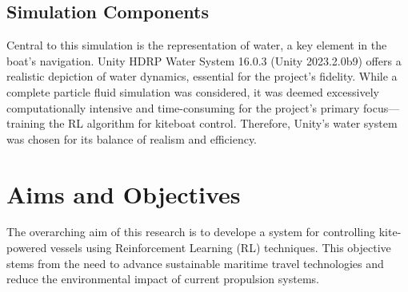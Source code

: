 \subsection{Simulation Components}
Central to this simulation is the representation of water, a key element in the boat's navigation. Unity HDRP Water System 16.0.3 (Unity 2023.2.0b9) offers a realistic depiction of water dynamics, essential for the project's fidelity. While a complete particle fluid simulation was considered, it was deemed excessively computationally intensive and time-consuming for the project's primary focus—training the RL algorithm for kiteboat control. Therefore, Unity's water system was chosen for its balance of realism and efficiency.







\section{Aims and Objectives}

The overarching aim of this research is to develope a system for controlling kite-powered vessels using Reinforcement Learning (RL) techniques. This objective stems from the need to advance sustainable maritime travel technologies and reduce the environmental impact of current propulsion systems. 

